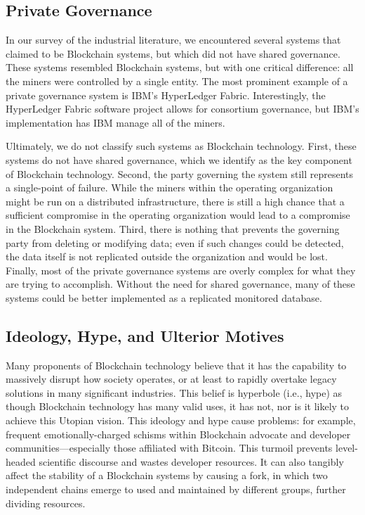\subsection{Private Governance}
In our survey of the industrial literature, we encountered several systems that claimed to be Blockchain systems, but which did not have shared governance.
These systems resembled Blockchain systems, but with one critical difference: all the miners were controlled by a single entity.
The most prominent example of a private governance system is IBM's HyperLedger Fabric.
Interestingly, the HyperLedger Fabric software project allows for consortium governance, but IBM's implementation has IBM manage all of the miners.

Ultimately, we do not classify such systems as Blockchain technology.
First, these systems do not have shared governance, which we identify as the key component of Blockchain technology.
Second, the party governing the system still represents a single-point of failure.
While the miners within the operating organization might be run on a distributed infrastructure, there is still a high chance that a sufficient compromise in the operating organization would lead to a compromise in the Blockchain system.
Third, there is nothing that prevents the governing party from deleting or modifying data; even if such changes could be detected, the data itself is not replicated outside the organization and would be lost.
Finally, most of the private governance systems are overly complex for what they are trying to accomplish.
Without the need for shared governance, many of these systems could be better implemented as a replicated monitored database.

\subsection{Ideology, Hype, and Ulterior Motives}
Many proponents of Blockchain technology believe that it has the capability to massively disrupt how society operates, or at least to rapidly overtake legacy solutions in many significant industries. This belief is hyperbole (i.e., hype) as though Blockchain technology has many valid uses, it has not, nor is it likely to achieve this Utopian vision. This ideology and hype cause problems: for example, frequent emotionally-charged schisms within Blockchain advocate and developer communities---especially those affiliated with Bitcoin. This turmoil prevents level-headed scientific discourse and wastes developer resources. It can also tangibly affect the stability of a Blockchain systems by causing a fork, in which two independent chains emerge to used and maintained by different groups, further dividing resources.

